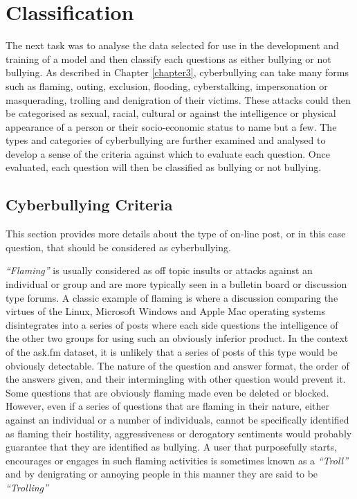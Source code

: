 \section{Classification}
\label{section:data_classification}

The next task was to analyse the data selected for use in the development and training of a model and then classify each questions as either bullying or not bullying. As described in Chapter \ref{chapter3}, cyberbullying can take many forms such as flaming, outing, exclusion, flooding, cyberstalking, impersonation or masquerading, trolling and denigration of their victims. These attacks could then be categorised as sexual, racial, cultural or against the intelligence or physical appearance of a person or their socio-economic status to name but a few. The types and categories of cyberbullying are further examined and analysed to develop a sense of the criteria against which to evaluate each question. Once evaluated, each question will then be classified as bullying or not bullying.

\subsection{Cyberbullying Criteria}

This section provides more details about the type of on-line post, or in this case question, that should be considered as cyberbullying.

\textit{``Flaming''} is usually considered as off topic insults or attacks against an individual or group and are more typically seen in a bulletin board or discussion type forums. A classic example of flaming is where a discussion comparing the virtues of the Linux, Microsoft Windows and Apple Mac operating systems disintegrates into a series of posts where each side questions the intelligence of the other two groups for using such an obviously inferior product. In the context of the ask.fm dataset, it is unlikely that a series of posts of this type would be obviously detectable. The nature of the question and answer format, the order of the answers given, and their intermingling with other question would prevent it. Some questions that are obviously flaming made even be deleted or blocked. However, even if a series of questions that are flaming in their nature, either against an individual or a number of individuals, cannot be specifically identified as flaming their hostility, aggressiveness or derogatory sentiments would probably guarantee that they are identified as bullying. A user that purposefully starts, encourages or engages in such flaming activities is sometimes known as a \textit{``Troll''} and by denigrating or annoying people in this manner they are said to be \textit{``Trolling''}

